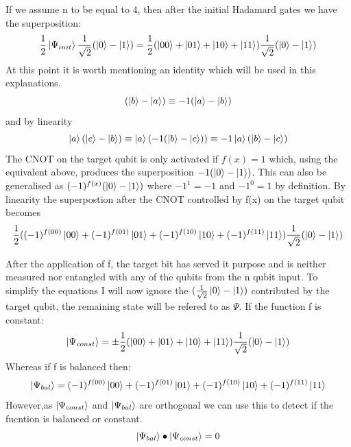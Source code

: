 \documentclass[authoryearcitations]{UoYCSproject}
\begin{document}
If we assume n to be equal to 4, then after the initial Hadamard gates we have the superposition:
\begin{equation}
\frac{1}{2}\left\vert{\Psi_{init}}\right\rangle\frac{1}{\sqrt{2}}(\left\vert{0}\right\rangle-\left\vert{1}\right\rangle)=\frac{1}{2}(\left\vert{00}\right\rangle+\left\vert{01}\right\rangle+\left\vert{10}\right\rangle+\left\vert{11}\right\rangle)\frac{1}{\sqrt{2}}(\left\vert{0}\right\rangle-\left\vert{1}\right\rangle)
\end{equation}
At this point it is worth mentioning an identity which will be used in this explanations.
\begin{equation}
(\left\vert{b}\right\rangle-\left\vert{a}\right\rangle)\equiv-1(\left\vert{a}\right\rangle-\left\vert{b}\right\rangle)
\end{equation}
and by linearity
\begin{equation}
\left\vert{a}\right\rangle(\left\vert{c}\right\rangle-\left\vert{b}\right\rangle)\equiv\left\vert{a}\right\rangle(-1(\left\vert{b}\right\rangle-\left\vert{c}\right\rangle))\equiv-1\left\vert{a}\right\rangle(\left\vert{b}\right\rangle-\left\vert{c}\right\rangle)
\label{target_qubit_identity}
\end{equation}
The CNOT on the target qubit is only activated if $f(x)=1$ which, using the equivalent above, produces the superposition $-1(\left\vert{0}\right\rangle-\left\vert{1}\right\rangle)$.
This can also be generalised as $(-1)^{f(x)}(\left\vert{0}\right\rangle-\left\vert{1}\right\rangle)$ where $-1^1=-1$ and $-1^0=1$ by definition.
By linearity the superpostion after the CNOT controlled by f(x) on the target qubit becomes
\begin{equation}
\frac{1}{2}((-1)^{f(00)}\left\vert{00}\right\rangle+(-1)^{f(01)}\left\vert{01}\right\rangle+(-1)^{f(10)}\left\vert{10}\right\rangle+(-1)^{f(11)}\left\vert{11}\right\rangle)\frac{1}{\sqrt{2}}(\left\vert{0}\right\rangle-\left\vert{1}\right\rangle)
\end{equation}

After the application of f, the target bit has served it purpose and is neither measured nor entangled with any of the qubits from the n qubit input.
To simplify the equations I will now ignore the $(\frac{1}{\sqrt{2}}\left\vert{0}\right\rangle-\left\vert{1}\right\rangle)$ contributed by the target qubit, the remaining state will be refered to as $\Psi$.
If the function f is constant:
\begin{equation}
\left\vert{\Psi_{const}}\right\rangle=\pm\frac{1}{2}(\left\vert{00}\right\rangle+\left\vert{01}\right\rangle+\left\vert{10}\right\rangle+\left\vert{11}\right\rangle)\frac{1}{\sqrt{2}}(\left\vert{0}\right\rangle-\left\vert{1}\right\rangle)
\end{equation}
Whereas if f is balanced then:
\begin{equation}
\left\vert{\Psi_{bal}}\right\rangle=(-1)^{f(00)}\left\vert{00}\right\rangle+(-1)^{f(01)}\left\vert{01}\right\rangle+(-1)^{f(10)}\left\vert{10}\right\rangle+(-1)^{f(11)}\left\vert{11}\right\rangle
\end{equation}
However,as $\left\vert{\Psi_{const}}\right\rangle$ and $\left\vert{\Psi_{bal}}\right\rangle$ are orthogonal we can use this to detect if the fucntion is balanced or constant.
\begin{equation}
\left\vert{\Psi_{bal}}\right\rangle\bullet\left\vert{\Psi_{const}}\right\rangle = 0
\end{equation}
\end{document}
